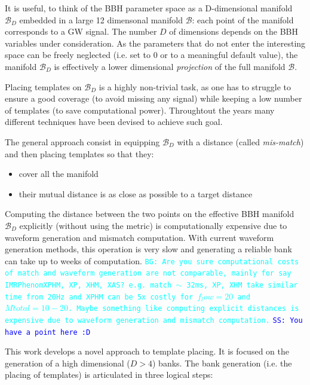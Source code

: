 \documentclass[twocolumn,showpacs,preprintnumbers,nofootinbib,prd,
superscriptaddress,10pt]{revtex4-2}
\newcommand{\stefano}[1]{{\textcolor{blue}{\texttt{SS: #1}} }}
\newcommand{\bhooshan}[1]{{\textcolor{cyan}{\texttt{BG: #1}} }}
\begin{document}
It is useful, to think of the BBH parameter space as a D-dimensional manifold $\mathcal{B}_D$ embedded in a large 12 dimensonal manifold $\mathcal{B}$: each point of the manifold corresponds to a GW signal. The number $D$ of dimensions depends on the BBH variables under consideration.
As the parameters that do not enter the interesting space can be freely neglected (i.e. set to $0$ or to a meaningful default value), the manifold $\mathcal{B}_D$ is effectively a lower dimensional {\it projection} of the full manifold $\mathcal{B}$.

Placing templates on $\mathcal{B}_D$ is a highly non-trivial task, as one has to struggle to ensure a good coverage (to avoid missing any signal) while keeping a low number of templates (to save computational power).
Throughtout the years many different techniques have been devised to achieve such goal.


The general approach consist in equipping $\mathcal{B}_D$ with a distance (called {\it mis-match}) and then placing templates so that they:
\begin{itemize}
	\item cover all the manifold
	\item their mutual distance is as close as possible to a target distance
\end{itemize}
Computing the distance between the two points on the effective BBH manifold $\mathcal{B}_D$ explicitly (without using the metric) is computationally expensive due to waveform generation and mismatch computation.
With current waveform generation methods, this operation is very slow and generating a reliable bank can take up to weeks of computation.
\bhooshan{Are you sure computational costs of match and waveform generation are not comparable, mainly for say IMRPhenomXPHM, XP, XHM, XAS? e.g. match $\sim$ 32ms, XP, XHM take similar time from 20Hz and XPHM can be 5x costly for $f_low=20$ and $Mtotal = 10-20$. Maybe something like computing explicit distances is expensive due to waveform generation and mismatch computation.} \stefano{You have a point here :D}

This work develops a novel approach to template placing. It is focused on the generation of a high dimensional ($D>4$) banks.
The bank generation (i.e. the placing of templates) is articulated in three logical steps:
\end{document}
